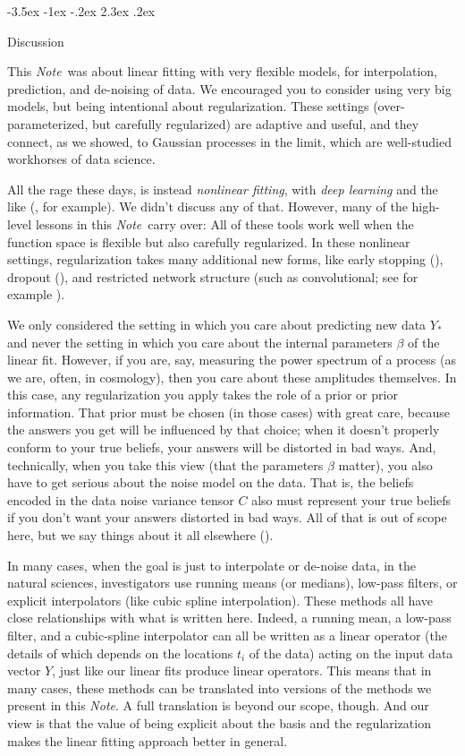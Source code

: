 \documentclass[12pt,letterpaper]{article}
\makeatletter
\renewcommand\section{\@startsection {section}{1}{\z@}%
  {-3.5ex \@plus -1ex \@minus -.2ex}%
  {2.3ex \@plus.2ex}%
  {\raggedright\normalfont\Large\bfseries}}
\newcommand{\documentname}{\textsl{Note}}
\makeatother
\begin{document}
\section{Discussion}\label{sec:discussion}

This \documentname\ was about linear fitting with very flexible models, for interpolation, prediction, and de-noising of data.
We encouraged you to consider using very big models, but being intentional about regularization.
These settings (over-parameterized, but carefully regularized) are adaptive and useful, and they connect, as we showed, to Gaussian processes in the limit, which are well-studied workhorses of data science.

All the rage these days, is instead \emph{nonlinear fitting}, with \emph{deep learning} and the like (\citealt{deep}, for example).
We didn't discuss any of that.
However, many of the high-level lessons in this \documentname\ carry over:
All of these tools work well when the function space is flexible but also carefully regularized.
In these nonlinear settings, regularization takes many additional new forms, like early stopping (\citealt{earlystop}), dropout (\citealt{dropout}), and restricted network structure (such as convolutional; see for example \citealt{bishop}).

We only considered the setting in which you care about predicting new data $Y_\ast$ and never the setting in which you care about the internal parameters $\beta$ of the linear fit.
However, if you are, say, measuring the power spectrum of a process (as we are, often, in cosmology), then you care about these amplitudes themselves.
In this case, any regularization you apply takes the role of a prior or prior information.
That prior must be chosen (in those cases) with great care, because the answers you get will be influenced by that choice; when it doesn't properly conform to your true beliefs, your answers will be distorted in bad ways.
And, technically, when you take this view (that the parameters $\beta$ matter), you also have to get serious about the noise model on the data.
That is, the beliefs encoded in the data noise variance tensor $C$ also must represent your true beliefs if you don't want your answers distorted in bad ways.
All of that is out of scope here, but we say things about it all elsewhere (\citealt{fitting}).

In many cases, when the goal is just to interpolate or de-noise data, in the natural sciences, investigators use running means (or medians), low-pass filters, or explicit interpolators (like cubic spline interpolation).
These methods all have close relationships with what is written here.
Indeed, a running mean, a low-pass filter, and a cubic-spline interpolator can all be written as a linear operator (the details of which depends on the locations $t_i$ of the data) acting on the input data vector $Y$, just like our linear fits produce linear operators.
This means that in many cases, these methods can be translated into versions of the methods we present in this \documentname.
A full translation is beyond our scope, though.
And our view is that the value of being explicit about the basis and the regularization makes the linear fitting approach better in general.
\end{document}
